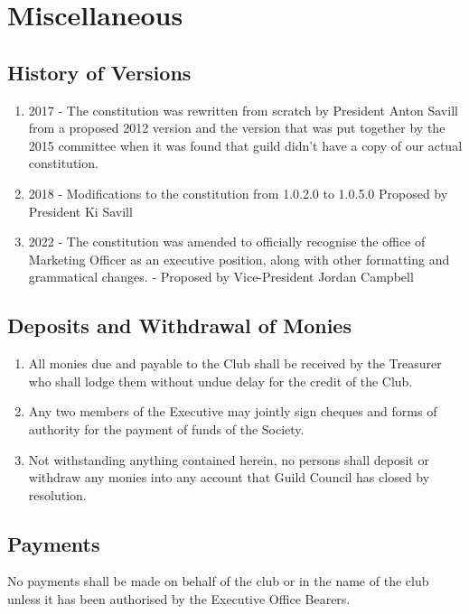 \documentclass[10pt,a4paper]{report}
\begin{document}
	\chapter{Miscellaneous}
		\section{History of Versions}
		    \begin{enumerate}[label=\arabic*]
			\item 2017 - The constitution was rewritten from scratch by President Anton Savill from a proposed 2012 version and the version that was put together by the 2015 committee when it was found that guild didn't have a copy of our actual constitution.
			\item 2018 - Modifications to the constitution from 1.0.2.0 to 1.0.5.0 Proposed by President Ki Savill
			\item 2022 - The constitution was amended to officially recognise the office of Marketing Officer as an executive position, along with other formatting and grammatical changes. - Proposed by Vice-President Jordan Campbell
			\end{enumerate}
	    \section{Deposits and Withdrawal of Monies}
			\begin{enumerate}[label=\arabic*]
				\item All monies due and payable to the Club shall be received by the Treasurer who shall lodge them without undue delay for the credit of the Club.
				\item Any two members of the Executive may jointly sign cheques and forms of authority for the payment of funds of the Society.
				\item Not withstanding anything contained herein, no persons shall deposit or withdraw any monies into any account that Guild Council has closed by resolution.
			\end{enumerate}
		
		\section{Payments}
			No payments shall be made on behalf of the club or in the name of the club unless it has been authorised by the Executive Office Bearers.
		
\end{document}
